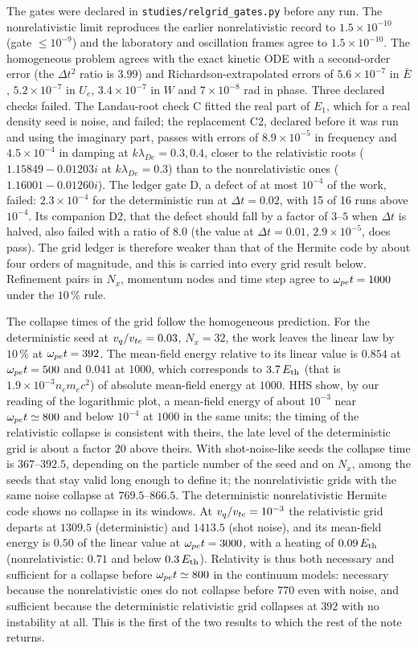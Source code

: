The gates were declared in \texttt{studies/relgrid\_gates.py} before any run. The nonrelativistic limit reproduces the earlier nonrelativistic record to $1.5\times10^{-10}$ (gate $\le10^{-9}$) and the laboratory and oscillation frames agree to $1.5\times10^{-10}$. The homogeneous problem agrees with the exact kinetic ODE with a second-order error (the $\Delta t^2$ ratio is $3.99$) and Richardson-extrapolated errors of $5.6\times10^{-7}$ in $\bar E$, $5.2\times10^{-7}$ in $U_e$, $3.4\times10^{-7}$ in $W$ and $7\times10^{-8}$ rad in phase. Three declared checks failed. The Landau-root check C fitted the real part of $E_1$, which for a real density seed is noise, and failed; the replacement C2, declared before it was run and using the imaginary part, passes with errors of $8.9\times10^{-5}$ in frequency and $4.5\times10^{-4}$ in damping at $k\lambda_{De}=0.3,0.4$, closer to the relativistic roots ($1.15849-0.01203i$ at $k\lambda_{De}=0.3$) than to the nonrelativistic ones ($1.16001-0.01260i$). The ledger gate D, a defect of at most $10^{-4}$ of the work, failed: $2.3\times10^{-4}$ for the deterministic run at $\Delta t=0.02$, with 15 of 16 runs above $10^{-4}$. Its companion D2, that the defect should fall by a factor of $3$--$5$ when $\Delta t$ is halved, also failed with a ratio of $8.0$ (the value at $\Delta t=0.01$, $2.9\times10^{-5}$, does pass). The grid ledger is therefore weaker than that of the Hermite code by about four orders of magnitude, and this is carried into every grid result below. Refinement pairs in $N_x$, momentum nodes and time step agree to $\omega_{pe} t=1000$ under the $10\,\%$ rule.


The collapse times of the grid follow the homogeneous prediction. For the deterministic seed at $v_q/v_{te}=0.03$, $N_x=32$, the work leaves the linear law by $10\,\%$ at $\omega_{pe} t=392$. The mean-field energy relative to its linear value is $0.854$ at $\omega_{pe} t=500$ and $0.041$ at $1000$, which corresponds to $3.7\,E_{\rm th}$ (that is $1.9\times10^{-3}n_em_ec^2$) of absolute mean-field energy at $1000$. HHS show, by our reading of the logarithmic plot, a mean-field energy of about $10^{-3}$ near $\omega_{pe} t\simeq800$ and below $10^{-4}$ at $1000$ in the same units; the timing of the relativistic collapse is consistent with theirs, the late level of the deterministic grid is about a factor $20$ above theirs. With shot-noise-like seeds the collapse time is $367$--$392.5$, depending on the particle number of the seed and on $N_x$, among the seeds that stay valid long enough to define it; the nonrelativistic grids with the same noise collapse at $769.5$--$866.5$. The deterministic nonrelativistic Hermite code shows no collapse in its windows. At $v_q/v_{te}=10^{-3}$ the relativistic grid departs at $1309.5$ (deterministic) and $1413.5$ (shot noise), and its mean-field energy is $0.50$ of the linear value at $\omega_{pe} t=3000$, with a heating of $0.09\,E_{\rm th}$ (nonrelativistic: $0.71$ and below $0.3\,E_{\rm th}$). Relativity is thus both necessary and sufficient for a collapse before $\omega_{pe} t\simeq800$ in the continuum models: necessary because the nonrelativistic ones do not collapse before $770$ even with noise, and sufficient because the deterministic relativistic grid collapses at $392$ with no instability at all. This is the first of the two results to which the rest of the note returns.


